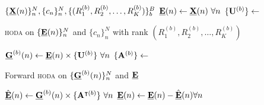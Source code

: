 \begin{algorithmic}[1]
	\Require $\{\underline{\mathbf{X}}(n)\}_n^N, \{c_n\}_n^N, \{(R_1^{(b)},R_2^{(b)},\ldots,R_K^{(b)})\}_b^B$
	\State $\underline{\mathbf{E}}(n)\gets\underline{\mathbf{X}}(n)\ \forall n$
	\State $\{\mathbf{U}^{(b)}\}\gets$ \parbox[t]{5cm}{\textsc{hoda} on $\{\underline{\mathbf{E}}(n)\}_n^N$ and
	$\{c_n\}_n^N$ with rank $(R_1^{(b)},R_2^{(b)},\ldots,R_K^{(b)})$}
	\State $\underline{\mathbf{G}}^{(b)}(n)\gets\underline{\mathbf{E}}(n)\times\{\mathbf{U}^{(b)}\}\
		\forall n$
	\State $\{\mathbf{A}^{(b)}\}\gets$ \parbox[t]{5cm}{Forward \textsc{hoda} on
		$\{\underline{\mathbf{G}}^{(b)}(n)\}_n^N$ and $\underline{\mathbf{E}}$}
	\State
	$\hat{\underline{\mathbf{E}}}(n)\gets\underline{\mathbf{G}}^{(b)}(n)\times\{\mathbf{A}^{\intercal(b)}\}\
		\forall n$
	\State
	$\underline{\mathbf{E}}(n)\gets \underline{\mathbf{E}}(n) - \hat{\underline{\mathbf{E}}}(n) \forall n$

	\EndFor
\end{algorithmic}

